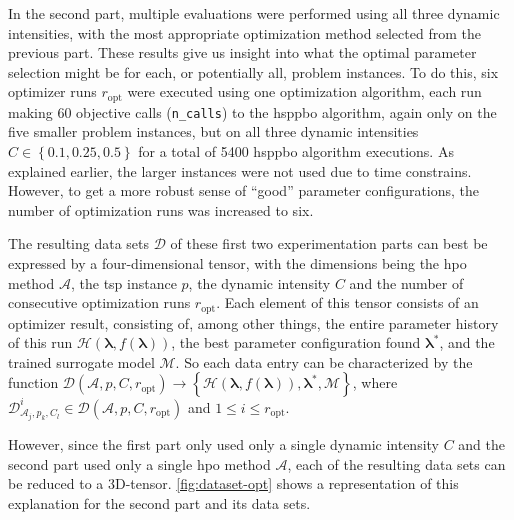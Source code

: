 In the second part, multiple evaluations were performed using all three dynamic intensities, with the most appropriate optimization method selected from the previous part. These results give us insight into what the optimal parameter selection might be for each, or potentially all, problem instances. To do this, six optimizer runs $r_\text{opt}$ were executed using one optimization algorithm, each run making 60 objective calls (\texttt{n\_calls}) to the \gls{hsppbo} algorithm, again only on the five smaller problem instances, but on all three dynamic intensities $C \in \left\lbrace 0.1,0.25,0.5 \right\rbrace$ for a total of 5400 \gls{hsppbo} algorithm executions. As explained earlier, the larger instances were not used due to time constrains. However, to get a more robust sense of \enquote{good} parameter configurations, the number of optimization runs was increased to six.

The resulting data sets $\mathcal{D}$ of these first two experimentation parts can best be expressed by a four-dimensional tensor, with the dimensions being the \gls{hpo} method $\mathcal{A}$, the \gls{tsp} instance $p$, the dynamic intensity $C$ and the number of consecutive optimization runs $r_\text{opt}$. Each element of this tensor consists of an optimizer result, consisting of, among other things, the entire parameter history of this run $\mathcal{H}(\mathbf{\lambda}, f(\mathbf{\lambda}))$, the best parameter configuration found $\mathbf{\lambda^*}$, and the trained surrogate model $\mathcal{M}$. So each data entry can be characterized by the function $\mathcal{D}(\mathcal{A},p,C,r_\text{opt}) \to \left\lbrace \mathcal{H}(\mathbf{\lambda}, f(\mathbf{\lambda})), \mathbf{\lambda^*}, \mathcal{M} \right\rbrace $, where 	$\mathcal{D}^i_{\mathcal{A}_j,p_k,C_l} \in \mathcal{D}(\mathcal{A},p,C,r_\text{opt})$ and $1 \leq i  \leq r_\text{opt}$.

 However, since the first part only used only a single dynamic intensity $C$ and the second part used only a single \gls{hpo} method $\mathcal{A}$, each of the resulting data sets can be reduced to a 3D-tensor.
 \cref{fig:dataset-opt} shows a representation of this explanation for the second part and its data sets.

